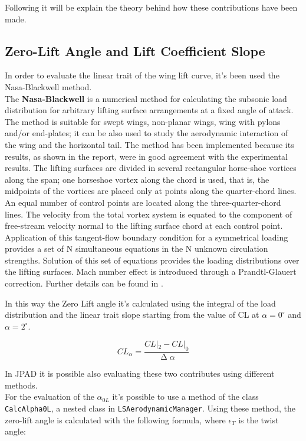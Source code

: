 Following it will be explain the theory behind how these contributions have been made.

\subsection{Zero-Lift Angle and Lift Coefficient Slope}

In order to evaluate the linear trait of the wing lift curve, it's been used the Nasa-Blackwell method.\\ The {\bfseries Nasa-Blackwell} is a numerical method for calculating the subsonic load distribution for arbitrary lifting surface arrangements at a fixed angle of attack. The method is suitable for swept wings, non-planar wings, wing with pylons and/or end-plates; it can be also used to study the aerodynamic interaction of the wing and the horizontal tail. The method has been implemented because its results, as shown in the report, were in good agreement with the experimental results.
The lifting surfaces are divided in several rectangular horse-shoe vortices along the span; one horseshoe vortex along the chord is used, that is, the midpoints of the vortices are placed only at points along the quarter-chord lines. An equal number of control points are located along the three-quarter-chord lines. The velocity from the total vortex system is equated to the component of free-stream velocity normal to the lifting surface chord at each control point. Application of this tangent-flow boundary condition for a symmetrical loading provides a set of N simultaneous equations in the N unknown circulation strengths. Solution of this set of equations provides the loading distributions over the lifting surfaces. Mach number effect is introduced through a Prandtl-Glauert correction. Further details can be found in \cite{NASA:Blackwell}.

In this way  the Zero Lift angle it's calculated using the integral of the load distribution and the linear trait slope starting from the value of CL at $\alpha =  0^{\circ}$ and $\alpha = 2^{\circ}$.

\begin{equation}
CL_{\alpha}= \frac{CL|_2 - CL|_0}{\upDelta \alpha}
\end{equation}

In JPAD it is possible also evaluating these two contributes using different methods. \\
For the evaluation of the $\alpha_{0L}$ it's possible to use a method of the class \texttt{CalcAlpha0L}, a nested class  in \texttt{LSAerodynamicManager}. Using these method, the zero-lift angle is calculated with the following formula, where $\epsilon_T$ is the twist angle:


